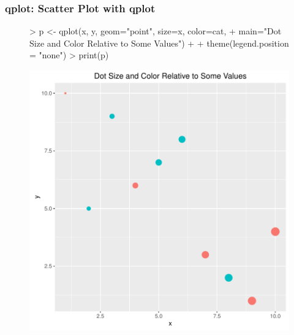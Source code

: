 \documentclass{beamer}
\begin{document}
\begin{frame}[containsverbatim]  
	\frametitle{qplot: Scatter Plot with qplot}
\scriptsize 
\begin{figure}
  \centering
\begin{Schunk}
\begin{Sinput}
> p <- qplot(x, y, geom="point", size=x, color=cat, 
+             main="Dot Size and Color Relative to Some Values") + 
+      theme(legend.position = "none")
> print(p)
\end{Sinput}
\end{Schunk}
\includegraphics{fig--036}
\label{fig:qplotscatter}
\end{figure}
\end{frame}
\end{document}
